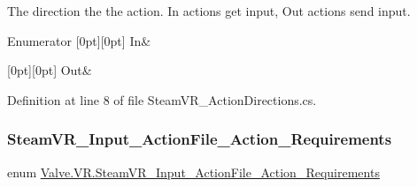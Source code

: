 The direction the the action. In actions get input, Out actions send input. 

\begin{DoxyEnumFields}{Enumerator}
[0pt][0pt]{}\mbox{\label{namespace_valve_1_1_v_r_a1e6192cb5ddaf204afab87ccb5728780aefeb369cccbd560588a756610865664c}} 
In&\\
\hline

[0pt][0pt]{}\mbox{\label{namespace_valve_1_1_v_r_a1e6192cb5ddaf204afab87ccb5728780a7c147cda9e49590f6abe83d118b7353b}} 
Out&\\
\hline

\end{DoxyEnumFields}


Definition at line 8 of file Steam\+V\+R\+\_\+\+Action\+Directions.\+cs.

\mbox{\label{namespace_valve_1_1_v_r_aad5d315b08bb9488c260d7228a1337e6}} 
\subsubsection{\texorpdfstring{SteamVR\_Input\_ActionFile\_Action\_Requirements}{SteamVR\_Input\_ActionFile\_Action\_Requirements}}
{\footnotesize\ttfamily enum \mbox{\hyperlink{namespace_valve_1_1_v_r_aad5d315b08bb9488c260d7228a1337e6}{Valve.\+V\+R.\+Steam\+V\+R\+\_\+\+Input\+\_\+\+Action\+File\+\_\+\+Action\+\_\+\+Requirements}}\hspace{0.3cm}{\ttfamily [strong]}}

